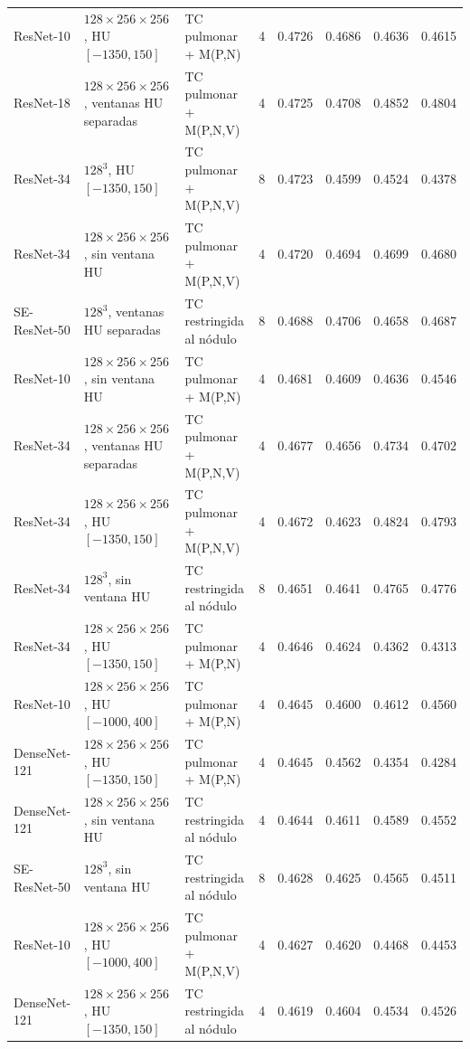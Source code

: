 \begin{table}[!htbp]
{\begin{tabular}{lllrcccc}
ResNet-10 &  \(128\times256\times256\), HU \([-1350,150]\) & TC pulmonar + M(P,N) & 4 & 0.4726 & 0.4686 & 0.4636 & 0.4615 \\
ResNet-18 &  \(128\times256\times256\), ventanas HU separadas & TC pulmonar + M(P,N,V) & 4 & 0.4725 & 0.4708 & 0.4852 & 0.4804 \\
ResNet-34 & \(128^3\), HU \([-1350,150]\) & TC pulmonar + M(P,N,V) & 8 & 0.4723 & 0.4599 & 0.4524 & 0.4378 \\
ResNet-34 &  \(128\times256\times256\), sin ventana HU & TC pulmonar + M(P,N,V) & 4 & 0.4720 & 0.4694 & 0.4699 & 0.4680 \\
SE-ResNet-50 & \(128^3\), ventanas HU separadas & TC restringida al nódulo & 8 & 0.4688 & 0.4706 & 0.4658 & 0.4687 \\
ResNet-10 &  \(128\times256\times256\), sin ventana HU & TC pulmonar + M(P,N) & 4 & 0.4681 & 0.4609 & 0.4636 & 0.4546 \\
ResNet-34 &  \(128\times256\times256\), ventanas HU separadas & TC pulmonar + M(P,N,V) & 4 & 0.4677 & 0.4656 & 0.4734 & 0.4702 \\
ResNet-34 &  \(128\times256\times256\), HU \([-1350,150]\) & TC pulmonar + M(P,N,V) & 4 & 0.4672 & 0.4623 & 0.4824 & 0.4793 \\
ResNet-34 & \(128^3\), sin ventana HU & TC restringida al nódulo & 8 & 0.4651 & 0.4641 & 0.4765 & 0.4776 \\
ResNet-34 &  \(128\times256\times256\), HU \([-1350,150]\) & TC pulmonar + M(P,N) & 4 & 0.4646 & 0.4624 & 0.4362 & 0.4313 \\
ResNet-10 &  \(128\times256\times256\), HU \([-1000,400]\) & TC pulmonar + M(P,N) & 4 & 0.4645 & 0.4600 & 0.4612 & 0.4560 \\
DenseNet-121 &  \(128\times256\times256\), HU \([-1350,150]\) & TC pulmonar + M(P,N) & 4 & 0.4645 & 0.4562 & 0.4354 & 0.4284 \\
DenseNet-121 &  \(128\times256\times256\), sin ventana HU & TC restringida al nódulo & 4 & 0.4644 & 0.4611 & 0.4589 & 0.4552 \\
SE-ResNet-50 & \(128^3\), sin ventana HU & TC restringida al nódulo & 8 & 0.4628 & 0.4625 & 0.4565 & 0.4511 \\
ResNet-10 &  \(128\times256\times256\), HU \([-1000,400]\) & TC pulmonar + M(P,N,V) & 4 & 0.4627 & 0.4620 & 0.4468 & 0.4453 \\
DenseNet-121 &  \(128\times256\times256\), HU \([-1350,150]\) & TC restringida al nódulo & 4 & 0.4619 & 0.4604 & 0.4534 & 0.4526 \\

\end{tabular}}
\end{table}
